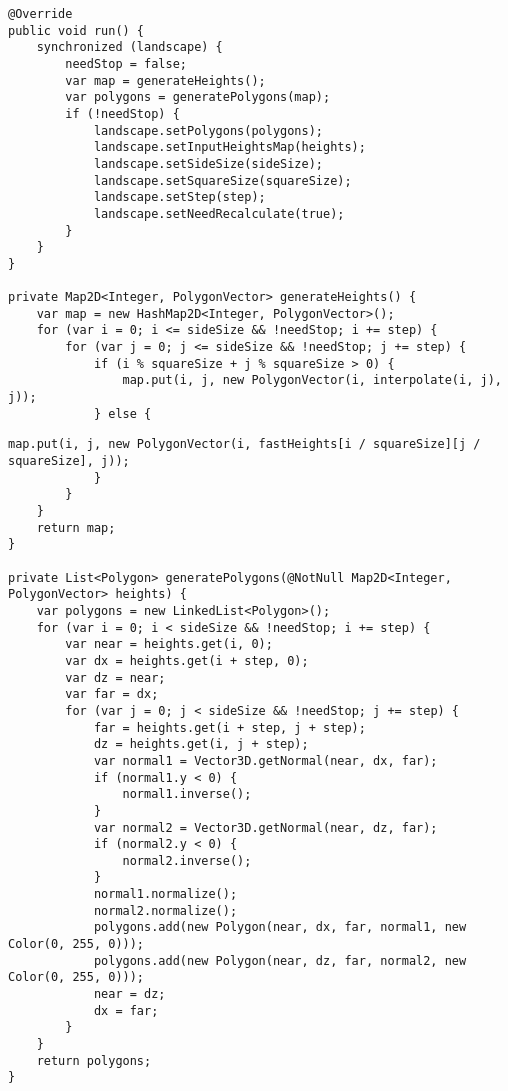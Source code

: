 \begin{lstlisting}[label=lst:gen1,caption=Реализация алгоритма генерации ландшафта (часть~1)]
@Override
public void run() {
	synchronized (landscape) {
		needStop = false;
		var map = generateHeights();
		var polygons = generatePolygons(map);
		if (!needStop) {
			landscape.setPolygons(polygons);
			landscape.setInputHeightsMap(heights);
			landscape.setSideSize(sideSize);
			landscape.setSquareSize(squareSize);
			landscape.setStep(step);
			landscape.setNeedRecalculate(true);
		}
	}
}

private Map2D<Integer, PolygonVector> generateHeights() {
	var map = new HashMap2D<Integer, PolygonVector>();
	for (var i = 0; i <= sideSize && !needStop; i += step) {
		for (var j = 0; j <= sideSize && !needStop; j += step) {
			if (i % squareSize + j % squareSize > 0) {
				map.put(i, j, new PolygonVector(i, interpolate(i, j), j));
			} else {
\end{lstlisting}
\begin{lstlisting}[label=lst:gen2,caption=Реализация алгоритма генерации ландшафта (часть~2)]
				map.put(i, j, new PolygonVector(i, fastHeights[i / squareSize][j / squareSize], j));
			}
		}
	}
	return map;
}

private List<Polygon> generatePolygons(@NotNull Map2D<Integer, PolygonVector> heights) {
	var polygons = new LinkedList<Polygon>();
	for (var i = 0; i < sideSize && !needStop; i += step) {
		var near = heights.get(i, 0);
		var dx = heights.get(i + step, 0);
		var dz = near;
		var far = dx;
		for (var j = 0; j < sideSize && !needStop; j += step) {
			far = heights.get(i + step, j + step);
			dz = heights.get(i, j + step);
			var normal1 = Vector3D.getNormal(near, dx, far);
			if (normal1.y < 0) {
				normal1.inverse();
			}
			var normal2 = Vector3D.getNormal(near, dz, far);
			if (normal2.y < 0) {
				normal2.inverse();
			}
			normal1.normalize();
			normal2.normalize();
			polygons.add(new Polygon(near, dx, far, normal1, new Color(0, 255, 0)));
			polygons.add(new Polygon(near, dz, far, normal2, new Color(0, 255, 0)));
			near = dz;
			dx = far;
		}
	}
	return polygons;
}
\end{lstlisting}
\clearpage
